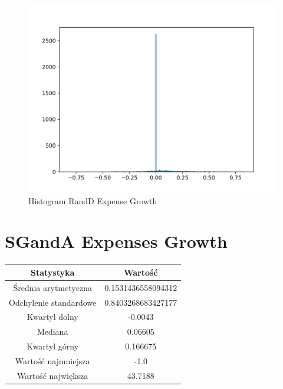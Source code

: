 \documentclass{article}
\begin{document}
\begin{figure}[h!]
    \includegraphics[width=\linewidth]{variables/R_D Expense Growth.png}
    \caption{Histogram RandD Expense Growth }
\end{figure}\section{ SGandA Expenses Growth }

\begin{center}
    \begin{tabular}{|c | c|} 
    \hline
    Statystyka & Wartość \\
    \hline\hline
    Średnia arytmetyczna & 0.1531436558094312 \\ 
    \hline
    Odchylenie standardowe & 0.8403268683427177 \\
    \hline
    Kwartyl dolny & -0.0043 \\
    \hline
    Mediana & 0.06605 \\
    \hline
    Kwartyl górny & 0.166675 \\
    \hline
    Wartość najmniejsza & -1.0 \\
    \hline
    Wartość największa & 43.7188 \\
    \hline
   \end{tabular}
\end{center}
\end{document}
